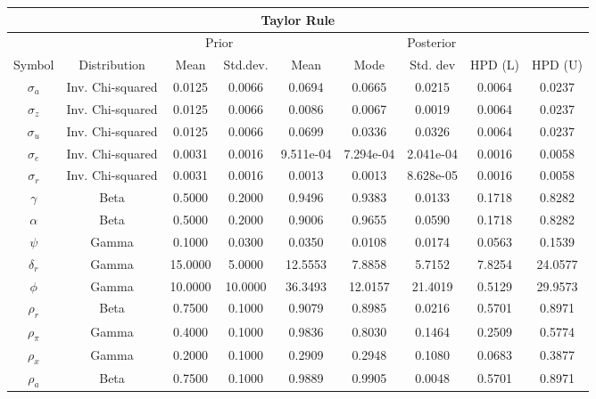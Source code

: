\documentclass[11pt,preprint, authoryear]{elsarticle}
\let\origtable\table
\let\endorigtable\endtable
\renewenvironment{table}[1][2] {
    \expandafter\origtable\expandafter[H]
} {
    \endorigtable
}
\numberwithin{equation}{section}
\numberwithin{figure}{section}
\numberwithin{table}{section}
\begin{document}
\begin{table}
\caption{Posterior Information - where HPD (L) and HPD (U) display the 90 percent Highest Posterior Density Interval Lower and Upper bound, respectively.}
 \begin{center}
\begin{tabular}{|c|c|c|c|c|c|c|c|c|}
\hline
\multicolumn{9}{|c|}{Taylor Rule} \\
\cline{1-9}
\hline
 &  & \multicolumn{2}{|c|}{Prior} & \multicolumn{5}{|c|}{Posterior}\\ 
  \cline{8-9}
\hline
  Symbol & Distribution & Mean & Std.dev. & Mean & Mode & Std. dev & HPD (L) & HPD (U)\\ 
\hline
$ {\sigma_a} $ & Inv. Chi-squared & 0.0125 & 0.0066  & 0.0694 & 0.0665 & 0.0215 & 0.0064 & 0.0237 \\ 
$ {\sigma_z} $ & Inv. Chi-squared  & 0.0125  & 0.0066  & 0.0086 & 0.0067 & 0.0019 & 0.0064 & 0.0237 \\ 
$ {\sigma_u} $ & Inv. Chi-squared & 0.0125  & 0.0066 & 0.0699 & 0.0336 & 0.0326 & 0.0064 & 0.0237 \\ 
$ {\sigma_e} $ & Inv. Chi-squared & 0.0031  & 0.0016 & 9.511e-04 & 7.294e-04  & 2.041e-04 & 0.0016 & 0.0058 \\ 
$ {\sigma_r} $ & Inv. Chi-squared & 0.0031  & 0.0016 & 0.0013 & 0.0013 & 8.628e-05 & 0.0016 & 0.0058 \\ 
$ {\gamma} $ & Beta & 0.5000  & 0.2000 & 0.9496 & 0.9383 & 0.0133 & 0.1718 & 0.8282 \\ 
$ {\alpha} $ & Beta & 0.5000 & 0.2000 & 0.9006 & 0.9655 & 0.0590 & 0.1718 & 0.8282 \\ 
$ {\psi} $ & Gamma & 0.1000  & 0.0300 & 0.0350  & 0.0108 & 0.0174 & 0.0563 & 0.1539 \\ 
$ {\delta_r} $ & Gamma & 15.0000 & 5.0000 & 12.5553  & 7.8858  & 5.7152 & 7.8254 & 24.0577 \\ 
$ {\phi} $ & Gamma & 10.0000 & 10.0000 & 36.3493 & 12.0157 & 21.4019 & 0.5129 & 29.9573 \\ 
$ {\rho_r} $ & Beta & 0.7500 & 0.1000 & 0.9079 & 0.8985 & 0.0216 &  0.5701 & 0.8971 \\ 
$ {\rho_\pi} $ & Gamma & 0.4000  & 0.1000  & 0.9836 & 0.8030 & 0.1464 & 0.2509 & 0.5774 \\ 
$ {\rho_x} $ & Gamma & 0.2000  & 0.1000 & 0.2909 & 0.2948 & 0.1080 & 0.0683 & 0.3877 \\ 
$ {\rho_a} $ & Beta & 0.7500 & 0.1000  & 0.9889 & 0.9905 & 0.0048 & 0.5701 & 0.8971 \\ 

\end{tabular}
\end{center}
\end{table}
\end{document}
